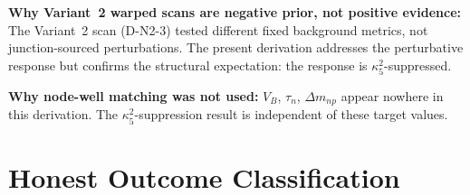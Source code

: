 \textbf{Why Variant~2 warped scans are negative prior, not positive
evidence:} The Variant~2 scan (D-N2-3) tested different fixed
background metrics, not junction-sourced perturbations. The present
derivation addresses the perturbative response but confirms the
structural expectation: the response is $\kappa_5^2$-suppressed.

\textbf{Why node-well matching was not used:} $V_B$, $\tau_n$,
$\Delta m_{np}$ appear nowhere in this derivation. The
$\kappa_5^2$-suppression result is independent of these target values.

\section{Honest Outcome Classification}
\label{sec:P2N2:outcome}

